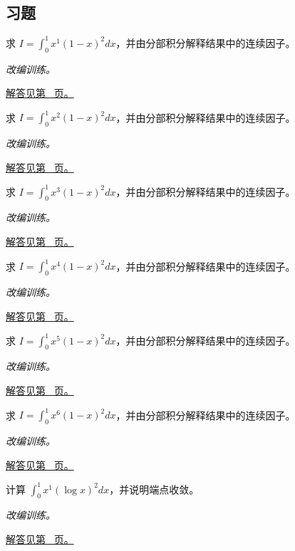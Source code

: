 \documentclass[12pt,fontset=fandol]{ctexart}
\begin{document}
\subsection{习题}
\begin{example}\label{ex:c20q1}
求 $I=\displaystyle\int_0^1x^{1}(1-x)^2dx$，并由分部积分解释结果中的连续因子。
\par\textit{改编训练。}\par\hyperref[ans:c20q1]{解答见第~\pageref{ans:c20q1} 页。}
\end{example}
\begin{example}\label{ex:c20q2}
求 $I=\displaystyle\int_0^1x^{2}(1-x)^2dx$，并由分部积分解释结果中的连续因子。
\par\textit{改编训练。}\par\hyperref[ans:c20q2]{解答见第~\pageref{ans:c20q2} 页。}
\end{example}
\begin{example}\label{ex:c20q3}
求 $I=\displaystyle\int_0^1x^{3}(1-x)^2dx$，并由分部积分解释结果中的连续因子。
\par\textit{改编训练。}\par\hyperref[ans:c20q3]{解答见第~\pageref{ans:c20q3} 页。}
\end{example}
\begin{example}\label{ex:c20q4}
求 $I=\displaystyle\int_0^1x^{4}(1-x)^2dx$，并由分部积分解释结果中的连续因子。
\par\textit{改编训练。}\par\hyperref[ans:c20q4]{解答见第~\pageref{ans:c20q4} 页。}
\end{example}
\begin{example}\label{ex:c20q5}
求 $I=\displaystyle\int_0^1x^{5}(1-x)^2dx$，并由分部积分解释结果中的连续因子。
\par\textit{改编训练。}\par\hyperref[ans:c20q5]{解答见第~\pageref{ans:c20q5} 页。}
\end{example}
\begin{example}\label{ex:c20q6}
求 $I=\displaystyle\int_0^1x^{6}(1-x)^2dx$，并由分部积分解释结果中的连续因子。
\par\textit{改编训练。}\par\hyperref[ans:c20q6]{解答见第~\pageref{ans:c20q6} 页。}
\end{example}
\begin{example}[对数权重的定积分]\label{ex:c20q7}
计算 $\displaystyle\int_0^1x^{1}(\log x)^2dx$，并说明端点收敛。
\par\textit{改编训练。}\par\hyperref[ans:c20q7]{解答见第~\pageref{ans:c20q7} 页。}
\end{example}
\end{document}
